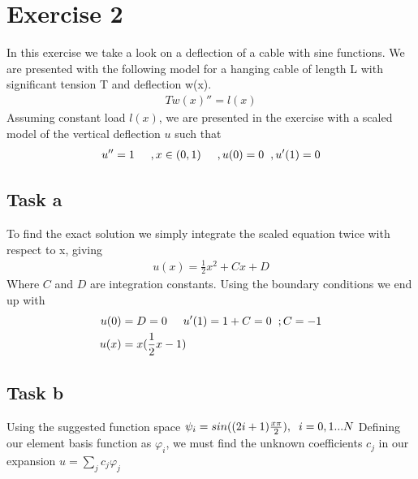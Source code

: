 \documentclass[a4paper,norsk]{article}
\begin{document}
\maketitle
\section*{Exercise 2}
In this exercise we take a look on a deflection of a cable with sine functions. We are presented with the following model for 
a hanging cable of length L with significant tension T and deflection w(x).
\begin{align*}
Tw(x)'' = l(x)
\end{align*}
Assuming constant load $l(x)$, we are presented in the exercise with a scaled model of the vertical deflection $u$ such that
\begin{align*}
u'' = 1 \hspace{5mm}, x\in (0,1) \hspace{5mm} ,u(0)=0 \hspace{2mm} ,u'(1)=0 
\end{align*}

\subsection*{Task a}
To find the exact solution we simply integrate the scaled equation twice with respect to x, giving
\begin{align*}
u(x) = \frac{1}{2}x^2 + Cx + D
\end{align*}
Where $C$ and $D$ are integration constants. Using the boundary conditions we end up with
\begin{align}
u(0) &= D = 0 \hspace{5mm} u'(1) = 1 + C = 0 \hspace{2mm}; C = -1 \\
u(x) &= x(\frac{1}{2}x - 1)
\end{align}

\subsection*{Task b}
Using the suggested function space $\psi_i = sin((2i+1)\frac{x \pi}{2}), \hspace{2mm}i = 0,1...N  $
Defining our element basis function as $\varphi_i$, we must find the unknown coefficients $c_j$ in our expansion
$u = \sum\limits_{j} c_j \varphi_j$ \\ 
\end{document}
